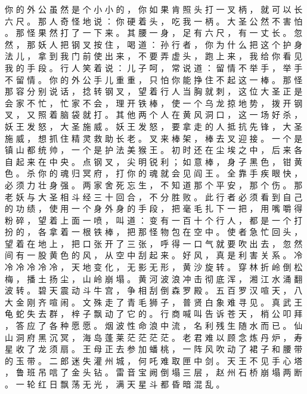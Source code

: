 {你 的 外 公 虽 然 是 个 小 小 的 ， 你 如 果 肯 照 头 打 一 叉 柄 ， 就 可 以 长 六 尺 。
那 人 奇 怪 地 说 ： 你 硬 着 头 ， 吃 我 一 柄 。
大 圣 公 然 不 害 怕 。
那 怪 果 然 打 了 一 下 来 。
其 腰 一 身 ， 足 有 六 尺 ， 有 一 丈 长 。
忽 然 ， 那 妖 人 把 钢 叉 按 住 ， 喝 道 ： 孙 行 者 ， 你 为 什 么 把 这 个 护 身 法 儿 ， 拿 到 我 门 前 使 出 来 ， 不 要 弄 虚 头 ， 跑 上 来 ， 我 给 你 看 见 我 的 手 段 。
行 人 笑 着 说 ： 儿 子 呵 ， 常 说 道 ： 留 情 不 举 手 ， 举 手 不 留 情 。
你 的 外 公 手 儿 重 重 ， 只 怕 你 能 挣 住 不 起 这 一 棒 。
那 怪 那 容 分 别 说 话 ， 捻 转 钢 叉 ， 望 着 行 人 当 胸 就 刺 ， 这 位 大 圣 正 是 会 家 不 忙 ， 忙 家 不 会 ， 理 开 铁 棒 ， 使 一 个 乌 龙 掠 地 势 ， 拨 开 钢 叉 ， 又 照 着 脑 袋 就 打 。
其 他 两 个 人 在 黄 风 洞 口 ， 这 一 场 好 杀 ， 妖 王 发 怒 ， 大 圣 施 威 。
妖 王 发 怒 ， 要 拿 走 的 人 抵 抗 先 锋 ， 大 圣 施 威 ， 想 抓 住 精 灵 救 助 长 老 。
叉 来 棒 架 ， 棒 去 叉 迎 接 。
一 个 是 镇 山 都 统 帅 ， 一 个 是 护 法 美 猴 王 。
初 时 还 在 尘 埃 之 中 ， 后 来 各 自 起 来 在 中 央 。
点 钢 叉 ， 尖 明 锐 利 ； 如 意 棒 ， 身 子 黑 色 ， 钳 黄 色 。
杀 你 的 魂 归 冥 府 ， 打 你 的 魂 就 会 见 阎 王 。
全 靠 手 疾 眼 快 ， 必 须 力 壮 身 强 。
两 家 舍 死 忘 生 ， 不 知 道 那 个 平 安 ， 那 个 伤 。
那 老 妖 与 大 圣 相 斗 经 三 十 回 合 ， 不 分 胜 败 。
此 行 者 必 须 看 到 自 己 的 功 绩 ， 使 用 一 个 身 外 身 的 手 段 ， 把 毫 毛 扎 下 一 把 ， 用 嘴 嚼 得 粉 碎 ， 望 着 上 面 一 喷 ， 叫 道 ： 变 有 一 百 十 个 行 人 ， 都 是 一 个 打 扮 的 ， 各 拿 着 一 根 铁 棒 ， 把 那 怪 物 包 在 空 中 。
使 者 急 忙 回 头 ， 望 着 在 地 上 ， 把 口 张 开 了 三 张 ， 呼 得 一 口 气 就 要 吹 出 去 ， 忽 然 间 有 一 股 黄 色 的 风 ， 从 空 中 刮 起 来 。
好 风 ， 真 是 利 害 关 系 。 冷 冷 冷 冷 冷 冷 ， 天 地 变 化 ， 无 影 无 形 ， 黄 沙 旋 转 。
穿 林 折 岭 倒 松 梅 ， 播 土 扬 尘 ， 山 岭 崩 塌 。
黄 河 波 浪 冲 击 彻 底 浑 ， 湘 江 水 涌 翻 波 转 。
碧 天 震 动 斗 牛 宫 ， 争 相 刮 倒 森 罗 殿 。
五 百 罗 汉 喧 天 ， 八 大 金 刚 齐 喧 闹 。
文 殊 走 了 青 毛 狮 子 ， 普 贤 白 象 难 寻 见 。
真 武 王 龟 蛇 失 去 群 ， 梓 子 飘 动 了 它 的 。
行 商 喊 叫 告 诉 苍 天 ， 梢 公 叩 拜 ， 答 应 了 各 种 愿 愿 。
烟 波 性 命 浪 中 流 ， 名 利 残 生 随 水 而 已 。
仙 山 洞 府 黑 沉 冥 ， 海 岛 蓬 莱 茫 茫 茫 茫 。
老 君 难 以 顾 念 炼 丹 炉 ， 寿 星 收 了 龙 须 扇 。
王 母 正 去 参 加 蟠 桃 ， 一 阵 风 吹 动 了 裙 子 和 腰 带 的 玉 带 。
二 郎 迷 失 灌 州 城 ， 何 吒 难 取 匣 中 剑 。
天 王 不 见 手 心 塔 ， 鲁 班 吊 唁 了 金 头 钻 。
雷 音 宝 阙 倒 塌 三 层 ， 赵 州 石 桥 崩 塌 两 断 。
一 轮 红 日 飘 荡 无 光 ， 满 天 星 斗 都 昏 暗 混 乱 。
}
